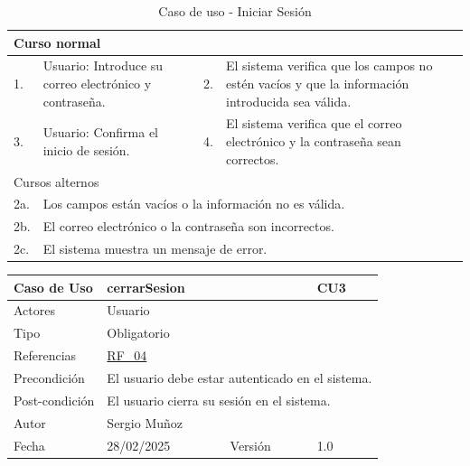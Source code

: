\begin{table}[H]
    \centering
    \begin{tabular}{| m{} | m{} | m{} | m{} |}
        \hline
        \multicolumn{4}{|m{0.9\textwidth}|}{Curso normal}     \\ 
        \hline
        1. & Usuario: Introduce su correo electrónico y contraseña. 
        & 2. & El sistema verifica que los campos no estén vacíos y que la información introducida sea válida. \\ 
        \hline
        3. & Usuario: Confirma el inicio de sesión. & 4. & El sistema verifica que el correo electrónico y la contraseña sean correctos.   \\ 
        \hline
        \multicolumn{4}{|m{0.9\textwidth}|}{Cursos alternos}     \\
        \hline 
        2a. & \multicolumn{3}{l|}{Los campos están vacíos o la información no es válida.} \\ 
        \hline
        2b. & \multicolumn{3}{l|}{El correo electrónico o la contraseña son incorrectos.} \\ 
        \hline
        2c. & \multicolumn{3}{l|}{El sistema muestra un mensaje de error.} \\ 
        \hline
    \end{tabular}
    \caption{Caso de uso - Iniciar Sesión}
\end{table}

\newpage

\begin{table}[H]
    \centering
    \begin{tabular}{| m{} | m{} | m{} | m{} |}
        \hline
        \rowcolor[HTML]{C0C0C0} Caso de Uso & \multicolumn{2}{|m{0.43\textwidth}|}{cerrarSesion} &  CU3\\ 
        \hline
        Actores & \multicolumn{3}{l|}{Usuario} \\ 
        \hline
        Tipo & \multicolumn{3}{l|}{Obligatorio} \\ 
        \hline
        Referencias & \multicolumn{3}{l|}{\hyperref[req:RF04]{RF\_04}} \\ 
        \hline
        Precondición & \multicolumn{3}{l|}{El usuario debe estar autenticado en el sistema.} \\ 
        \hline
        Post-condición & \multicolumn{3}{l|}{El usuario cierra su sesión en el sistema.} \\ 
        \hline
        Autor & \multicolumn{3}{l|}{Sergio Muñoz} \\ 
        \hline
        Fecha & 28/02/2025 & Versión & 1.0 \\ 
        \hline
    \end{tabular}
\end{table}

